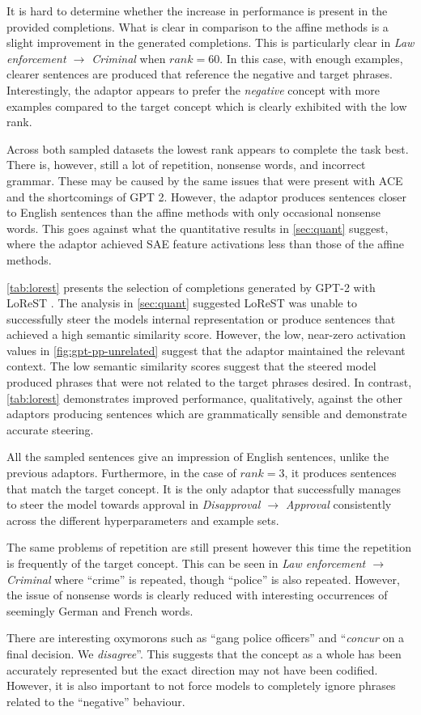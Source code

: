 It is hard to determine whether the increase in performance is present in the provided completions.
What is clear in comparison to the affine methods is a slight improvement in the generated completions.
This is particularly clear in \emph{Law enforcement $\to$ Criminal} when $rank = 60$.
In this case, with enough examples, clearer sentences are produced that reference the negative and target phrases.
Interestingly, the adaptor appears to prefer the \emph{negative} concept with more examples compared to the target concept which is clearly exhibited with the low rank.

Across both sampled datasets the lowest rank appears to complete the task best.
There is, however, still a lot of repetition, nonsense words, and incorrect grammar.
These may be caused by the same issues that were present with ACE and the shortcomings of GPT 2.
However, the adaptor produces sentences closer to English sentences than the affine methods with only occasional nonsense words.
This goes against what the quantitative results in \cref{sec:quant} suggest, where the adaptor achieved SAE feature activations less than those of the affine methods.




\cref{tab:lorest} presents the selection of completions generated by GPT-2 with LoReST \citep{steering-clear}.
The analysis in \cref{sec:quant} suggested LoReST was unable to successfully steer the models internal representation or produce sentences that achieved a high semantic similarity score.
However, the low, near-zero activation values in \cref{fig:gpt-pp-unrelated} suggest that the adaptor maintained the relevant context.
The low semantic similarity scores suggest that the steered model produced phrases that were not related to the target phrases desired.
In contrast, \cref{tab:lorest} demonstrates improved performance, qualitatively, against the other adaptors producing sentences which are grammatically sensible and demonstrate accurate steering.

All the sampled sentences give an impression of English sentences, unlike the previous adaptors.
Furthermore, in the case of $rank = 3$, it produces sentences that match the target concept.
It is the only adaptor that successfully manages to steer the model towards approval in \emph{Disapproval $\to$ Approval} consistently across the different hyperparameters and example sets.

The same problems of repetition are still present however this time the repetition is frequently of the target concept.
This can be seen in \emph{Law enforcement $\to$ Criminal} where ``crime'' is repeated, though ``police'' is also repeated.
However, the issue of nonsense words is clearly reduced with interesting occurrences of seemingly German and French words.

There are interesting oxymorons such as ``gang police officers'' and ``\emph{concur} on a final decision. We \emph{disagree}''.
This suggests that the concept as a whole has been accurately represented but the exact direction may not have been codified.
However, it is also important to not force models to completely ignore phrases related to the ``negative'' behaviour.
